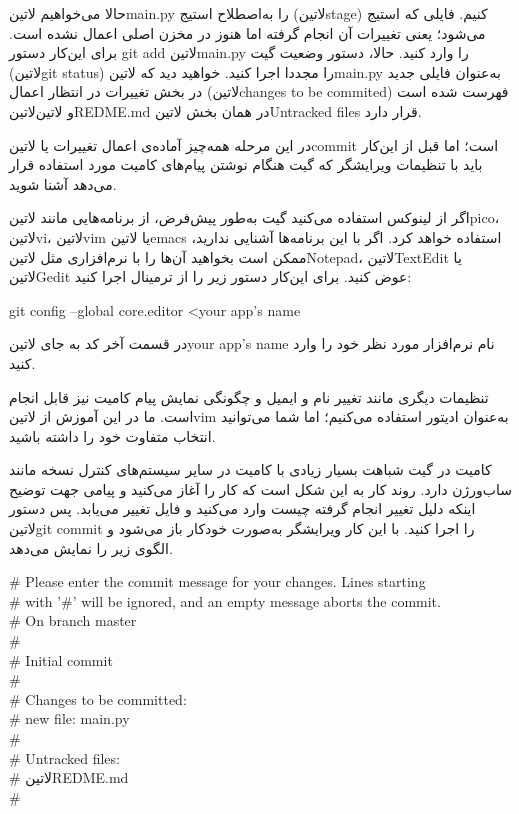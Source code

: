 حالا می‌خواهیم ‌لاتین{main.py} را به‌اصطلاح استیج (‌لاتین{stage}) کنیم. فایلی که استیج می‌شود؛ یعنی تغییرات آن انجام گرفته اما هنوز در مخزن اصلی اعمال نشده است. برای این‌کار دستور git add ‌لاتین{main.py} را وارد کنید. حالا، دستور وضعیت گیت (‌لاتین{git status}) را مجددا اجرا کنید. خواهید دید که ‌لاتین{main.py} به‌عنوان فایلی جدید در بخش تغییرات در انتظار اعمال (‌لاتین{changes to be commited}) فهرست شده است و ‌لاتین{‌لاتین{REDME.md}} در همان بخش ‌لاتین{Untracked files} قرار دارد.

در این مرحله همه‌چیز آماده‌ی اعمال تغییرات یا ‌لاتین{commit} است؛ اما قبل از این‌کار باید با تنظیمات ویرایشگر که گیت هنگام نوشتن پیام‌های کامیت مورد استفاده قرار می‌دهد آشنا شوید.

اگر از لینوکس استفاده می‌کنید گیت به‌طور پیش‌فرض، از برنامه‌‌هایی مانند ‌لاتین{pico}، ‌لاتین{vi}، ‌لاتین{vim} یا ‌لاتین{emacs} استفاده خواهد کرد. اگر با این برنامه‌ها آشنایی ندارید، ممکن است بخواهید آن‌ها را با نرم‌افزاری مثل ‌لاتین{Notepad}، ‌لاتین{TextEdit} یا ‌لاتین{Gedit} عوض کنید. برای این‌کار دستور زیر را از ترمینال اجرا کنید:

\begin{latin}
	git config --global core.editor <your app's name
\end{latin}
در قسمت آخر کد به جای ‌لاتین{your app's name} نام نرم‌افزار مورد نظر خود را وارد کنید.

تنظیمات دیگری مانند تغییر نام و ایمیل و چگونگی نمایش پیام کامیت نیز قابل انجام است. ما در این آموزش از ‌لاتین{vim} به‌عنوان ادیتور استفاده می‌کنیم؛ اما شما می‌توانید انتخاب متفاوت خود را داشته باشید.

کامیت در گیت شباهت بسیار زیادی با کامیت در سایر سیستم‌های کنترل نسخه مانند ساب‌ورژن دارد. روند کار به این شکل است که کار را آغاز می‌کنید و پیامی جهت توضیح اینکه دلیل تغییر انجام گرفته چیست وارد می‌کنید و فایل تغییر می‌یابد. پس دستور ‌لاتین{git commit} را اجرا کنید. با این کار ویرایشگر به‌صورت خودکار باز می‌شود و الگوی زیر را نمایش می‌دهد.

\begin{latin}
	\singlespacing
	\noindent
\# Please enter the commit message for your changes. Lines starting\\
\# with '\#' will be ignored, and an empty message aborts the commit.\\
\# On branch master\\
\#\\
\# Initial commit\\
\#\\
\# Changes to be committed:\\
\#       new file: ‌main.py\\
\#\\
\# Untracked files:\\
\#       ‌لاتین{REDME.md}\\
\#\\
\end{latin}

